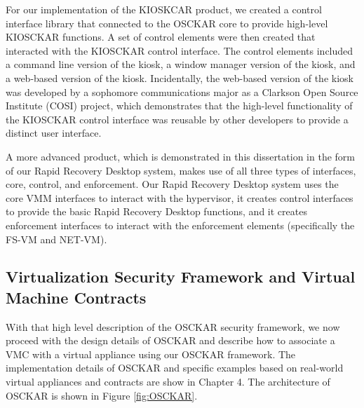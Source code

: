 
For our implementation of the KIOSKCAR product, we created a control interface library that connected to the OSCKAR core to provide high-level KIOSCKAR functions. A set of control elements were then created that interacted with the KIOSCKAR control interface. The control elements included a command line version of the kiosk, a window manager version of the kiosk, and a web-based version of the kiosk. Incidentally, the web-based version of the kiosk was developed by a sophomore communications major as a Clarkson Open Source Institute (COSI) project, which demonstrates that the high-level functionality of the KIOSCKAR control interface was reusable by other developers to provide a distinct user interface.

A more advanced product, which is demonstrated in this dissertation in the form of our Rapid Recovery Desktop system, makes use of all three types of interfaces, core, control, and enforcement. Our Rapid Recovery Desktop system uses the core VMM interfaces to interact with the hypervisor, it creates control interfaces to provide the basic Rapid Recovery Desktop functions, and it creates enforcement interfaces to interact with the enforcement elements (specifically the FS-VM and NET-VM). 

\subsection{Virtualization Security Framework and Virtual Machine Contracts}
With that high level description of the OSCKAR security framework, we now proceed with the design details of OSCKAR and describe how to associate a VMC with a virtual appliance using our OSCKAR framework. The implementation details of OSCKAR and specific examples based on real-world virtual appliances and contracts are show in Chapter 4. The architecture of OSCKAR is shown in Figure \ref{fig:OSCKAR}.

